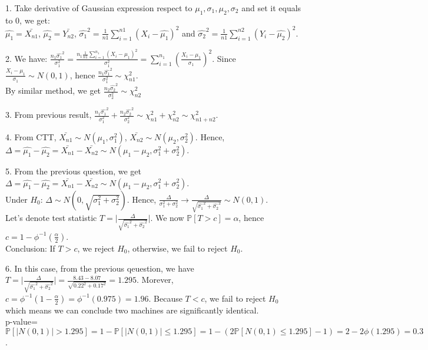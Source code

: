 \documentclass[10pt]{article}
\newenvironment{problem}[2][Problem]{\begin{trivlist}
\item[\hskip \labelsep {\bfseries #1}\hskip \labelsep {\bfseries #2.}]}{\end{trivlist}}
\begin{document}
\begin{problem}{2}
\item 1.
Take derivative of Gaussian expression respect to $\mu_1, \sigma_1, \mu_2, \sigma_2$ and set it equals to 0, we get:\\
$\hat{\mu_1}=\bar{X_{n1}}$, $\hat{\mu_2}=\bar{Y_{n2}}$, $\hat{\sigma_1}^2=\frac{1}{n1}\sum_{i=1}^{n1} (X_i-\hat{\mu_1})^2$ and $\hat{\sigma_2}^2=\frac{1}{n1}\sum_{i=1}^{n2} (Y_i-\hat{\mu_2})^2$.

\item 2.
We have: $\frac{n_1\hat{\sigma_1}^2}{\sigma_1^2}=\frac{n_1\frac{1}{n1}\sum_{i=1}^{n_1} (X_i-\mu_1)^2}{\sigma_1^2}=\sum_{i=1}^{n_1}(\frac{X_i-\mu_1}{\sigma_1})^2$. Since $\frac{X_i-\mu_1}{\sigma_1}\sim N(0,1)$, hence $\frac{n_1\hat{\sigma_1}^2}{\sigma_1^2} \sim \chi_{n1}^2$.\\
By similar method, we get $\frac{n_2\hat{\sigma_2}^2}{\sigma_2^2} \sim \chi_{n2}^2$






\item 3.
From previous result, $\frac{n_1\hat{\sigma_1}^2}{\sigma_1^2} + \frac{n_2\hat{\sigma_2}^2}{\sigma_2^2} \sim \chi_{n1}^2 + \chi_{n2}^2 \sim \chi_{n1+n2}^2$.


\item 4.
From CTT, $\bar{X_{n1}} \sim N(\mu_1, \sigma_1^2)$, $\bar{X_{n2}} \sim N(\mu_2, \sigma_2^2)$. Hence, $\Delta=\hat{\mu_1}-\hat{\mu_2}=\bar{X_{n1}}- \bar{X_{n2}} \sim N(\mu_1-\mu_2, \sigma_1^2+\sigma_2^2)$.


\item 5.
From the previous question, we get $\Delta=\hat{\mu_1}-\hat{\mu_2}=\bar{X_{n1}}- \bar{X_{n2}} \sim N(\mu_1-\mu_2, \sigma_1^2+\sigma_2^2)$.\\
Under $H_0$: $\Delta \sim N(0,\sqrt{ \sigma_1^2+\sigma_2^2})$. Hence, $\frac{\Delta}{\sigma_1^2+\sigma_2^2} \rightarrow \frac{\Delta}{\sqrt{\hat{\sigma_1}^2 + \hat{\sigma_2}^2}} \sim N(0,1)$.\\
Let's denote test statistic $T=\Big | \frac{\Delta}{\sqrt{\hat{\sigma_1}^2 + \hat{\sigma_2}^2}}\Big |$. We now $\mathbb{P}[T > c]=\alpha$, hence $c=1-\phi^{-1}(\frac{\alpha}{2})$.\\
Conclusion: If $T>c$, we reject $H_0$, otherwise, we fail to reject $H_0$.


\item 6.
In this case, from the previous qeuestion, we have $T=\Big | \frac{\Delta}{\sqrt{\hat{\sigma_1}^2 + \hat{\sigma_2}^2}}\Big |=\frac{8.43-8.07}{\sqrt{0.22^2+0.17^2}}=1.295$. Morever, $c=\phi^{-1}(1-\frac{\alpha}{2})=\phi^{-1}(0.975)=1.96$. Because $T<c$, we fail to reject $H_0$ which means we can conclude two machines are significantly identical.\\
p-value=$\mathbb{P}[|N(0,1)|>1.295]=1-\mathbb{P}[|N(0,1)| \leqslant 1.295]=1-(2\mathbb{P}[N(0,1) \leqslant 1.295]-1)=2-2\phi(1.295)=0.3$.




\end{problem}
\end{document}
